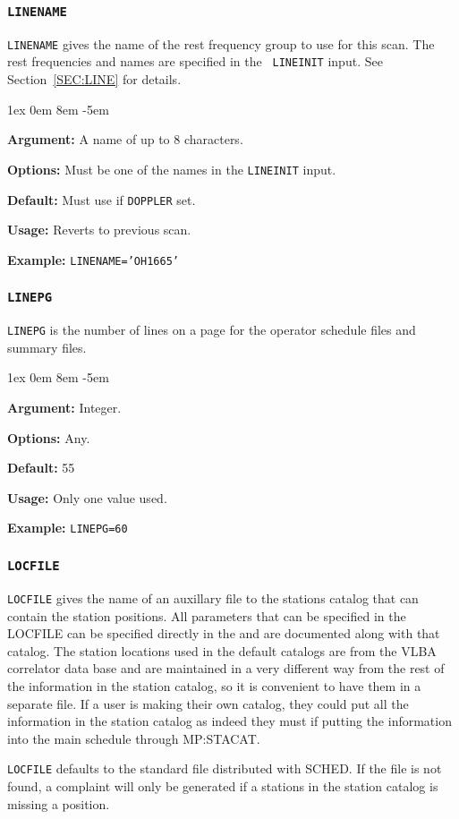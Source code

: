 \documentclass{report}
\newcommand{\sched}{{\sc SCHED}}
\newcommand{\rcwbox}[5]{
  \begin{list}{}{\parsep 1ex  \itemsep 0em
                 \leftmargin 8em  \itemindent -5em }
    \item {\bf Argument:} #1
    \item {\bf Options:}  #2
    \item {\bf Default:}  #3
    \item {\bf Usage:}    #4
    \item {\bf Example:}  #5
  \end{list}
}
\begin{document}
\subsubsection{\label{MP:LINENAME}{\tt LINENAME}}

{\tt LINENAME} gives the name of the rest frequency group to use for
this scan. The rest frequencies and names are specified in the {\tt
LINEINIT} input. See Section~\ref{SEC:LINE} for details.

\rcwbox
{A name of up to 8 characters.}
{Must be one of the names in the {\tt LINEINIT} input.}
{Must use if {\tt DOPPLER} set.}
{Reverts to previous scan.}
{{\tt LINENAME='OH1665'}}


\subsubsection{\label{MP:LINEPG}{\tt LINEPG}}

{\tt LINEPG} is the number of lines on a page for the operator
schedule files and summary files.

\rcwbox
{Integer.}
{Any.}
{55}
{Only one value used.}
{{\tt LINEPG=60}}

\subsubsection{\label{MP:LOCFILE}{\tt LOCFILE}}

{\tt LOCFILE} gives the name of an auxillary file to the stations
catalog that can contain the station positions.  All parameters that
can be specified in the LOCFILE can be specified directly in the
 and are documented along with
that catalog.  The station locations used in the default catalogs are
from the VLBA correlator data base and are maintained in a very
different way from the rest of the information in the station
catalog, so it is convenient to have them in a separate file.  If
a user is making their own catalog, they could put all the
information in the station catalog as indeed they must if putting
the information into the main schedule through 
{MP:STACAT}.

{\tt LOCFILE} defaults to the standard file distributed with
\sched.  If the file is not found, a complaint will only be
generated if a stations in the station catalog is missing
a position.
\end{document}
